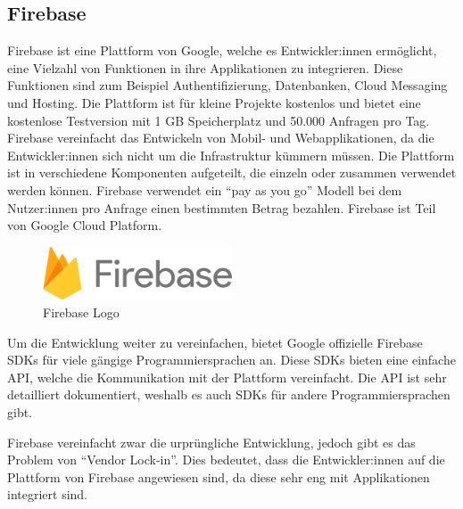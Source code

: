 ﻿\subsection{Firebase}
\label{sec:firebase}

Firebase ist eine Plattform von Google, welche es Entwickler:innen ermöglicht, eine Vielzahl von Funktionen in ihre Applikationen zu integrieren. Diese Funktionen sind zum Beispiel Authentifizierung, Datenbanken, Cloud Messaging und Hosting. Die Plattform ist für kleine Projekte kostenlos und bietet eine kostenlose Testversion mit 1 GB Speicherplatz und 50.000 Anfragen pro Tag. Firebase vereinfacht das Entwickeln von Mobil- und Webapplikationen, da die Entwickler:innen sich nicht um die Infrastruktur kümmern müssen. Die Plattform ist in verschiedene Komponenten aufgeteilt, die einzeln oder zusammen verwendet werden können. Firebase verwendet ein \enquote{pay as you go} Modell bei dem Nutzer:innen pro Anfrage einen bestimmten Betrag bezahlen. Firebase ist Teil von Google Cloud Platform.

\begin{figure}[h]
  \centering
  \includegraphics[width=0.5\textwidth]{images/firebase_logo}
  \caption{Firebase Logo }
  \label{fig:firebase_logo}
\end{figure}

Um die Entwicklung weiter zu vereinfachen, bietet Google offizielle Firebase \acp{SDK} für viele gängige Programmiersprachen an. Diese \acp{SDK} bieten eine einfache \ac{API}, welche die Kommunikation mit der Plattform vereinfacht. Die \ac{API} ist sehr detailliert dokumentiert, weshalb es auch \acp{SDK} für andere Programmiersprachen gibt.

Firebase vereinfacht zwar die urprüngliche Entwicklung, jedoch gibt es das Problem von \enquote{Vendor Lock-in}. Dies bedeutet, dass die Entwickler:innen auf die Plattform von Firebase angewiesen sind, da diese sehr eng mit Applikationen integriert sind.
